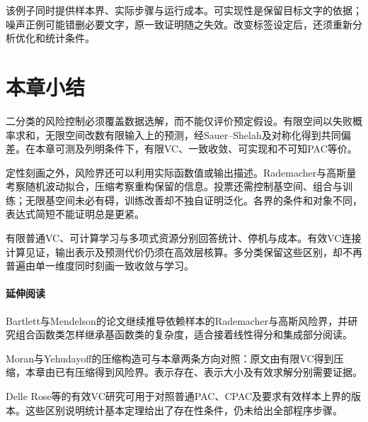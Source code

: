 该例子同时提供样本界、实际步骤与运行成本。可实现性是保留目标文字的依据；噪声正例可能错删必要文字，原一致证明随之失效。改变标签设定后，还须重新分析优化和统计条件。

\section{本章小结}
\label{sec:binary-learning-summary}

二分类的风险控制必须覆盖数据选解，而不能仅评价预定假设。有限空间以失败概率求和，无限空间改数有限输入上的预测，经Sauer--Shelah及对称化得到共同偏差。在本章可测及列明条件下，有限VC、一致收敛、可实现和不可知PAC等价。

定性刻画之外，风险界还可以利用实际函数值或输出描述。Rademacher与高斯量考察随机波动拟合，压缩考察重构保留的信息。投票还需控制基空间、组合与训练；无限基空间未必有碍，训练改善却不独自证明泛化。各界的条件和对象不同，表达式简短不能证明总是更紧。

有限普通VC、可计算学习与多项式资源分别回答统计、停机与成本。有效VC连接计算见证，输出表示及预测代价仍须在高效层核算。多分类保留这些区别，却不再普遍由单一维度同时刻画一致收敛与学习。

\paragraph{延伸阅读}
Bartlett与Mendelson的论文继续推导依赖样本的Rademacher与高斯风险界，并研究组合函数类怎样继承基函数类的复杂度，适合接着线性得分和集成部分阅读。

Moran与Yehudayoff的压缩构造可与本章两条方向对照：原文由有限VC得到压缩，本章由已有压缩得到风险界。表示存在、表示大小及有效求解分别需要证据。

Delle Rose等的有效VC研究可用于对照普通PAC、CPAC及要求有效样本上界的版本。这些区别说明统计基本定理给出了存在性条件，仍未给出全部程序步骤。
